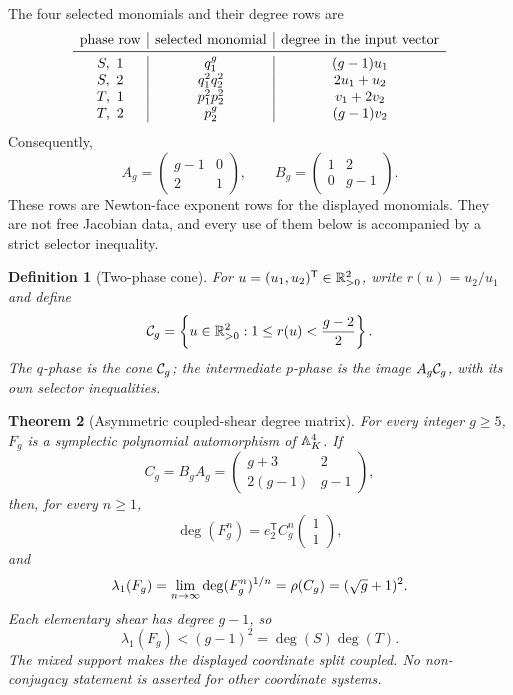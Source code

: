 \documentclass[11pt]{article}
\newtheorem{theorem}{Theorem}[section]
\newtheorem{definition}[theorem]{Definition}
\theoremstyle{remark}
\numberwithin{equation}{section}
\begin{document}
The four selected monomials and their degree rows are
\[
\begin{array}{c|c|c}
\text{phase row} & \text{selected monomial} & \text{degree in the input vector}\\
\midrule
S,\ 1 & q_1^g & (g-1)u_1\\
S,\ 2 & q_1^2q_2^2 & 2u_1+u_2\\
T,\ 1 & p_1^2p_2^2 & v_1+2v_2\\
T,\ 2 & p_2^g & (g-1)v_2
\end{array}
\]
Consequently,
\[
 A_g=\begin{pmatrix}g-1&0\\2&1\end{pmatrix},\qquad
 B_g=\begin{pmatrix}1&2\\0&g-1\end{pmatrix}.
\]
These rows are Newton-face exponent rows for the displayed monomials.  They
are not free Jacobian data, and every use of them below is accompanied by a
strict selector inequality.

\begin{definition}[Two-phase cone]
For \(u=(u_1,u_2)^{\mathsf T}\in\mathbb{R}_{>0}^2\), write \(r(u)=u_2/u_1\) and define
\[
 \mathcal{C}_g=\left\{u\in\mathbb{R}_{>0}^2:
 1\leq r(u)<\frac{g-2}{2}\right\}.
\]
The \(q\)-phase is the cone \(\mathcal{C}_g\); the intermediate \(p\)-phase is the
image \(A_g\mathcal{C}_g\), with its own selector inequalities.
\end{definition}

\begin{theorem}[Asymmetric coupled-shear degree matrix]\label{thm:main}
For every integer \(g\geq5\), \(F_g\) is a symplectic polynomial automorphism
of \(\mathbb{A}^4_K\).  If
\[
 C_g=B_gA_g=
 \begin{pmatrix}g+3&2\\2(g-1)&g-1\end{pmatrix},
\]
then, for every \(n\geq1\),
\begin{equation}\label{eq:degree-main}
 \deg(F_g^n)=e_2^{\mathsf T}C_g^n
 \begin{pmatrix}1\\1\end{pmatrix},
\end{equation}
and
\begin{equation}\label{eq:lambda-main}
 \lambda_1(F_g)
 =\lim_{n\to\infty}\deg(F_g^n)^{1/n}
 =\rho(C_g)
 =(\sqrt g+1)^2.
\end{equation}
Each elementary shear has degree \(g-1\), so
\[
 \lambda_1(F_g)<(g-1)^2=\deg(S)\deg(T).
\]
The mixed support makes the displayed coordinate split coupled.  No
non-conjugacy statement is asserted for other coordinate systems.
\end{theorem}
\end{document}
